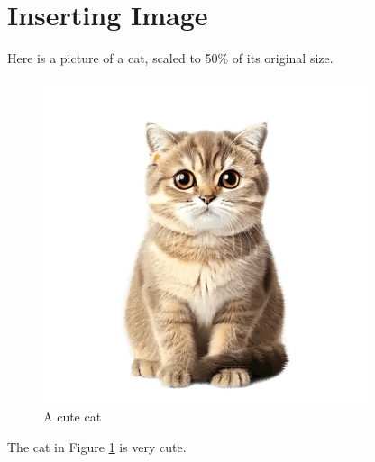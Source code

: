 \documentclass{article}
\begin{document}
\vspace{8cm}
\section{Inserting Image}
Here is a picture of a cat, scaled to 50\% of its original size.

\begin{figure}[h!]
    \centering
    \includegraphics[scale=0.5]{cat_picture2.png} %
    \caption{A cute cat}
    \label{fig:cat}
\end{figure}

The cat in Figure \ref{fig:cat} is very cute.
\end{document}
